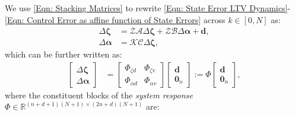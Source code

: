 \documentclass[letterpaper, 10 pt, conference]{ieeeconf}
\newcommand{\A}{\mathcal{A}}
\newcommand{\B}{\mathcal{B}}
\newcommand{\C}{\mathcal{C}}
\newcommand{\K}{\mathcal{K}}
\newcommand{\R}{\mathbb{R}}
\newcommand{\Z}{\mathcal{Z}}
\newcommand{\?}{\stackrel{?}{=}}
\newcommand{\paramDim}{d}
\newcommand{\varDim}{n}
\newcommand{\ratePGDStacked}{\boldsymbol{\ratePGD}}
\newcommand{\ratePGDErrorStacked}{\Delta\ratePGDStacked}
\newcommand{\disturbance}{d}
\newcommand{\disturbanceStacked}{\boldsymbol{\disturbance}}
\newcommand{\ratePGD}{\alpha}
\newcommand{\feedbackGainStacked}{\K}
\newcommand{\downshift}{\Z}
\newcommand{\systemResponse}{\Phi}
\newcommand{\jacobianStateStacked}{\A}
\newcommand{\jacobianControlStacked}{\B}
\newcommand{\outputMatrixStacked}{\C}
\newcommand{\iterationHorizon}{N}
\newcommand{\state}{\zeta}
\newcommand{\stateStacked}{\boldsymbol{\state}}
\newcommand{\stateErrorStacked}{\Delta\stateStacked}
\newcommand{\outputNoise}{v}
\newcommand{\zero}{\textbf{0}}
\begin{document}
We use \eqref{Eqn: Stacking Matrices} to rewrite \eqref{Eqn: State Error LTV Dynamics}-\eqref{Eqn: Control Error as affine function of State Errors} across $k \in [0, \iterationHorizon]$ as:%
{
\setlength{\abovedisplayskip}{3.5pt}
\setlength{\belowdisplayskip}{3.5pt}
\begin{subequations}
\label{Eqn: State and Control Errors, Stacked}
\begin{align}
    \label{Eqn: State Errors, Stacked}
    \stateErrorStacked &= \downshift \jacobianStateStacked  \stateErrorStacked + \downshift 
    \jacobianControlStacked \ratePGDErrorStacked + \disturbanceStacked, \\
    \label{Eqn: Control Errors, Stacked}
    \ratePGDErrorStacked &= \feedbackGainStacked \outputMatrixStacked \stateErrorStacked,
\end{align}
\end{subequations}
}
\hspace{-1mm}which can be further written as:
{
\setlength{\abovedisplayskip}{4pt}
\setlength{\belowdisplayskip}{4pt}
\begin{align}
    \label{Eqn: State and Control Errors, Stacked, written using System Responses}
    \begin{bmatrix}
        \stateErrorStacked \\ \ratePGDErrorStacked
    \end{bmatrix}
    &= \begin{bmatrix}
        \systemResponse_{\state \disturbance} & \systemResponse_{\state \outputNoise} \\
        \systemResponse_{\ratePGD \disturbance} & \systemResponse_{\ratePGD \outputNoise}
    \end{bmatrix}
    \begin{bmatrix}
        \disturbanceStacked \\ \zero_{\varDim}
    \end{bmatrix} := \systemResponse \begin{bmatrix}
        \disturbanceStacked \\ \zero_{\varDim}
    \end{bmatrix},
\end{align}
}
\hspace{-1.5mm}where the constituent blocks of the \textit{system response} $\systemResponse \in \R^{(\varDim + \paramDim + 1)(\iterationHorizon+1) \times (2\varDim + \paramDim)(\iterationHorizon+1)}$ are:
\end{document}
